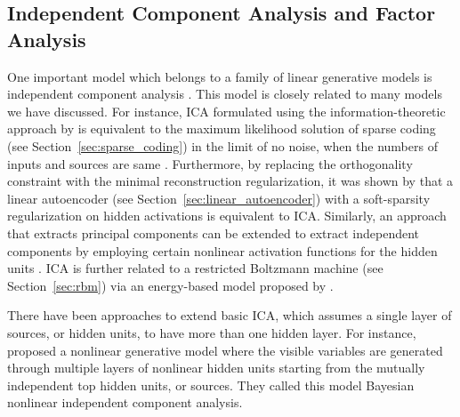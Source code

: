 \documentclass[dissertation,nocontribution]{aaltoseries}
\begin{document}


\subsection{Independent Component Analysis and Factor Analysis}
\label{sec:ica_fa}

One important model which belongs to a family of linear
generative models is independent component analysis
\citep[ICA, see, e.g.,][]{Hyvarinen2001}. This model is closely related to
many models we have discussed.  For instance, ICA formulated
using the information-theoretic approach by \citet{Bell1995}
is equivalent to the maximum likelihood solution of sparse
coding (see Section~\ref{sec:sparse_coding}) in the limit of
no noise, when the numbers of inputs and
sources are same \citep{Olshausen1997}.  Furthermore, by
replacing the orthogonality constraint with the minimal
reconstruction regularization, it was shown by
\citet{Le2011} that a linear autoencoder (see
Section~\ref{sec:linear_autoencoder}) with a
soft-sparsity regularization on hidden activations is
equivalent to ICA. Similarly, an approach that extracts
principal components can be extended to extract independent
components by employing certain nonlinear
activation functions for the hidden units \citep[see,
e.g.,][]{Oja1997,Hyvarinen2001}. ICA is further related
to a restricted Boltzmann machine (see
Section~\ref{sec:rbm}) via an energy-based model proposed by
\citet{Teh2003}.

There have been approaches to extend basic ICA, which
assumes a single layer of sources, or hidden units, to have
more than one hidden layer. For instance,
\citet{Lappalainen2000} proposed a nonlinear generative
model where the visible variables are generated through
multiple layers of nonlinear hidden units starting from the
mutually independent top hidden units, or sources. They
called this model Bayesian nonlinear independent component
analysis. 
\end{document}
